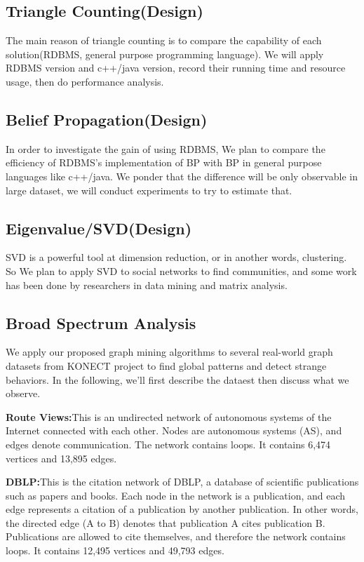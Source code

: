 \subsection{Triangle Counting(Design)}
The main reason of triangle counting is to compare the capability of each solution(RDBMS, general purpose programming language). We will apply RDBMS version and c++/java version, record their running time and resource usage, then do performance analysis. 

\subsection{Belief Propagation(Design)}
In order to investigate the gain of using RDBMS, We plan to compare the efficiency of RDBMS's implementation of BP with BP in general purpose languages like c++/java. We ponder that the difference will be only observable in large dataset, we will conduct experiments to try to estimate that. 

\subsection{Eigenvalue/SVD(Design)}
SVD is a powerful tool at dimension reduction, or in another words, clustering. So We plan to apply SVD to social networks to find communities, and some work has been done by researchers in data mining and matrix analysis. 

\subsection{Broad Spectrum Analysis}
We apply our proposed graph mining algorithms to several real-world graph datasets from KONECT project to find global patterns and detect strange behaviors. In the following, we'll first describe the dataest then discuss  what we observe. 

\begin{description}
	\item{{\bf Route Views\cite{konect:2013:as20000102, konect:DBLP}:}}{This is an undirected network of autonomous systems of the Internet connected with each other. Nodes are autonomous systems (AS), and edges denote communication. The network contains loops. It contains 6,474 vertices and 13,895 edges.}
	\item{{\bf DBLP\cite{konect:2013:dblp-cite, konect:DBLP}:}}{This is the citation network of DBLP, a database of scientific publications such as papers and books. Each node in the network is a publication, and each edge represents a citation of a publication by another publication. In other words, the directed edge (A to B) denotes that publication A cites publication B. Publications are allowed to cite themselves, and therefore the network contains loops. It contains 12,495 vertices and 49,793 edges.}
\end{description}

